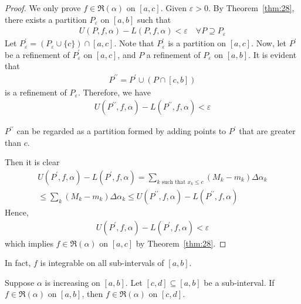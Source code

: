 \documentclass[thmcnt=section, 12pt]{my-elegantbook}
\begin{document}
\begin{proof}
    We only prove $f \in \mathfrak{R}(\alpha)$ on $[a, c]$. Given $\varepsilon > 0$. By Theorem~\ref{thm:28}, there exists a partition $P_\varepsilon$ on $[a, b]$ such that
    \begin{align*}
        U(P,f,\alpha) - L(P,f,\alpha) < \varepsilon
        \quad \forall P \supseteq P_\varepsilon
    \end{align*}
    Let $P_\varepsilon^\prime = (P_\varepsilon \cup \{ c \}) \cap [a, c]$. Note that $P_\varepsilon^\prime$ is a partition on $[a, c]$. Now, let $P^\prime$ be a refinement of $ P_\varepsilon^\prime$ on $[a, c]$, and $P$ a refinement of $P_\varepsilon$ on $[a, b]$. It is evident that
    \begin{align*}
        P^{\prime\prime} = P^\prime \cup (P \cap [c, b])
    \end{align*}
    is a refinement of $P_\varepsilon$. Therefore, we have
    \begin{align*}
        U(P^{\prime\prime},f,\alpha) - L(P^{\prime\prime},f,\alpha) < \varepsilon
    \end{align*}
    \begin{note}
        $P^{\prime\prime}$ can be regarded as a partition formed by adding points to $P^\prime$ that are greater than $c$.
    \end{note}
    Then it is clear
    \begin{multline*}
        U(P^{\prime},f,\alpha) - L(P^{\prime},f,\alpha)
        = \sum_{k \text{ such that } x_k \leq c} (M_k - m_k) \Delta \alpha_k \\
        \leq \sum_{k} (M_k - m_k) \Delta \alpha_k
        \leq U(P^{\prime\prime},f,\alpha) - L(P^{\prime\prime},f,\alpha)
    \end{multline*}
    Hence,
    \begin{align*}
        U(P^{\prime},f,\alpha) - L(P^{\prime},f,\alpha) < \varepsilon
    \end{align*}
    which implies $f \in \mathfrak{R}(\alpha)$ on $[a, c]$ by Theorem~\ref{thm:28}.
\end{proof}

In fact, $f$ is integrable on all sub-intervals of $[a, b]$.


\begin{theorem} \label{thm:40}
    Suppose $\alpha$ is increasing on $[a, b]$. Let $[c, d] \subseteq [a, b]$ be a sub-interval. If $f \in \mathfrak{R}(\alpha)$ on $[a, b]$, then $f \in \mathfrak{R}(\alpha)$ on $[c, d]$.
\end{theorem}
\end{document}
